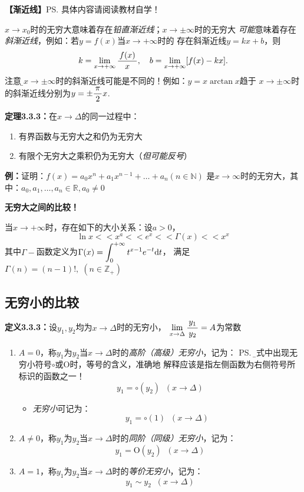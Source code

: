 {\bf 【渐近线】}\ps{具体内容请阅读教材自学！}

$x\to x_0$时的无穷大意味着存在{\it 铅直渐近线}；$x\to\pm\infty$时的无穷大
{\it 可能}意味着存在{\it 斜渐近线}，例如：若$y=f(x)$当$x\to+\infty$时的
存在斜渐近线$y=kx+b$，则
$$k=\lim\limits_{x\to{+\infty}}\displaystyle\frac{\,{f(x)}\,}{\,{x}\,},\quad b=\lim\limits_{x\to{+\infty}}[f(x)-kx].$$
注意，{\b $x\to\pm\infty$时的斜渐近线可能是不同的！}例如：$y=x\arctan x$趋于
$x\to\pm\infty$时的斜渐近线分别为$y=\pm\displaystyle\frac{\,{\pi}\,}{\,{2}\,}x$.


{\bf 定理3.3.3：}在$x\to\Delta$的同一过程中：
\begin{enumerate}[(1)]
  \setlength{\itemindent}{1cm}
  \item 有界函数与无穷大之和仍为无穷大
  \item 有限个无穷大之乘积仍为无穷大（{\it 但可能反号}）
\end{enumerate}

{\bf 例：}证明：$f(x)=a_0x^n+a_1x^{n-1}+\ldots+a_n(n\in\mathbb{N})$
是$x\to\infty$时的无穷大，其中：$a_0,a_1,\ldots,a_n\in\mathbb{R},a_0\ne 0$

\begin{shaded}
	{\bf 无穷大之间的比较！}
	
	当$x\to+\infty$时，存在如下的大小关系：设$a>0$，
	$$\ln x<<x^a<<e^x<<\Gamma(x)<<x^x$$
	其中$\Gamma-$函数定义为$\Gamma(x)=\displaystyle\int_0^{+\infty}t^{x-1}e^{-t}\mathrm{d} t$，
	满足$\Gamma(n)=(n-1)!,\;(n\in\mathbb{Z}_+)$
\end{shaded}

\subsection{无穷小的比较}

{\bf 定义3.3.3：}设$y_1,y_2$均为$x\to\Delta$时的无穷小，
$\lim\limits_{x\to{\Delta}}\displaystyle\frac{\,{y_1}\,}{\,{y_2}\,}=A$为常数
\begin{enumerate}[(1)]
  \setlength{\itemindent}{1cm}
  \item $A=0$，称$y_1$为$y_2$当$x\to\Delta$时的{\it 高阶（高级）无穷小}，记为：
  \ps{\b 等式中出现无穷小符号$\circ$或$\mathrm{O}$时，等号的含义，准确地
  解释应该是指左侧函数为右侧符号所标识的函数之一！}
  $$y_1=\circ( y_2)\;\;(x\to\Delta)$$
  \begin{itemize}
    \item {\it 无穷小}可记为：
    $$y_1=\circ(1)\;\;(x\to\Delta)$$
  \end{itemize}
  \item $A\ne 0$，称$y_1$为$y_2$当$x\to\Delta$时的{\it 同阶（同级）无穷小}，记为：
  $$y_1=\mathrm{O}( y_2)\;\;(x\to\Delta)$$
  \item $A=1$，称$y_1$为$y_2$当$x\to\Delta$时的{\it 等价无穷小}，记为：
  $$y_1\sim y_2\;\;(x\to\Delta)$$
\end{enumerate}

